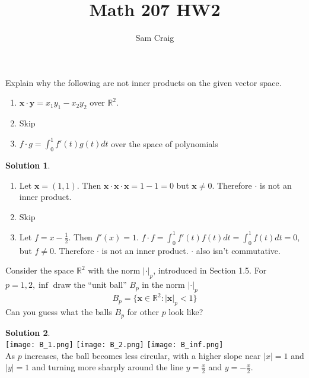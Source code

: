 \documentclass[11pt]{article}
\title{Math 207 HW2}
\author{Sam Craig}
\theoremstyle{definition}
\newenvironment{customex}[1]
  {\renewcommand\theinnercustomex{#1}\innercustomex}
  {\endinnercustomex}
\newtheorem*{solution}{Solution}
\newcommand{\R}{\mathbb{R}}
\newcommand{\vx}{\mathbf{x}}
\newcommand{\vy}{\mathbf{y}}
\begin{document}
    \maketitle

    \begin{customex}{5.1.5a and c}
        Explain why the following are not inner products on the given vector space.
        \begin{enumerate}[label = \alph*)]
            \item $\vx \cdot \vy = x_1y_1 - x_2y_2$ over $\R^2$.
            \item Skip
            \item $f \cdot g = \int_0^1 f'(t)g(t)dt$ over the space of polynomials
        \end{enumerate}
    \end{customex}

    \begin{solution}
        \begin{enumerate}[label = \alph*)]
            \item Let $\vx = (1,1)$. Then $\vx \cdot \vx \cdot \vx = 1 - 1 = 0$ but $\vx \neq 0$. Therefore $\cdot$ is not an inner product.
            \item Skip
            \item Let $f = x - \frac{1}{2}$. Then $f'(x) = 1$. $f \cdot f = \int_0^1 f'(t)f(t) dt = \int_0^1 f(t) dt = 0$, but $f \neq 0$. Therefore $\cdot$ is not an inner product. $\cdot$ also isn't commutative.
        \end{enumerate}
    \end{solution}
    
    \begin{customex}{5.1.9}
        Consider the space $\R^2$ with the norm $| \cdot |_p$, introduced in Section 1.5. For
        $p = 1,2,\inf$ draw the “unit ball” $B_p$ in the norm $| \cdot |_p$ 
            $$B_p = \{\vx \in \R^2 : |\vx|_p < 1\}$$
        Can you guess what the balls $B_p$ for other $p$ look like?
    \end{customex}

    \begin{solution}
       ~\\\texttt{[image: B\_1.png]}
        \texttt{[image: B\_2.png]}
        \texttt{[image: B\_inf.png]}\\
        As $p$ increases, the ball becomes less circular, with a higher slope near $|x| = 1$ and $|y| = 1$ and turning more sharply around the line $y = \frac{x}{2}$ and $y = - \frac{x}{2}$.
    \end{solution}
\end{document}
